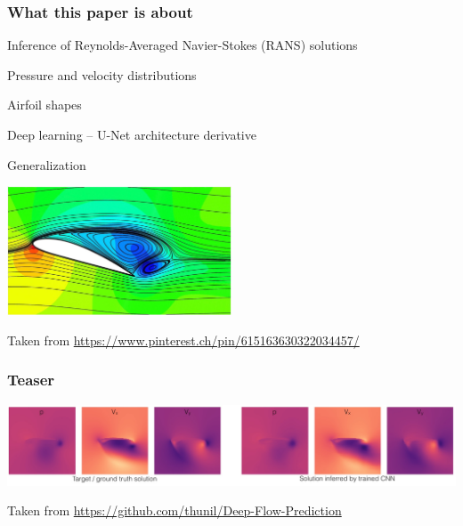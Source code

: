 
\begin{frame}
    \frametitle{What this paper is about}
	\vspace*{0.8cm}
\begin{multicols}{2}
\begin{PraesentationAufzaehlung}
	
\item Inference of Reynolds-Averaged Navier-Stokes (RANS) solutions 

\item Pressure and velocity distributions

\item Airfoil shapes

\item Deep learning -- U-Net architecture derivative 

\item Generalization
\end{PraesentationAufzaehlung}
\vfill\columnbreak
\includegraphics[width=0.5\textwidth, height=.5\textheight]{./Ressourcen/Praesentation/Bilder/streamlines.jpg}

\end{multicols}
Taken from \url{https://www.pinterest.ch/pin/615163630322034457/}

\end{frame}
\clearpage

\begin{frame}
    \frametitle{Teaser}
	\vspace*{3cm}
	
	\includegraphics[width=\textwidth, height=.3\textheight]{./Ressourcen/Praesentation/Bilder/teaser.jpg}
	
\vspace*{1cm}	
Taken from \url{https://github.com/thunil/Deep-Flow-Prediction}
	
\end{frame}
\clearpage